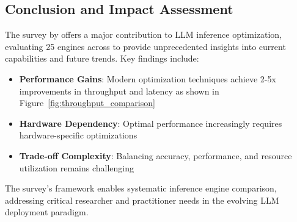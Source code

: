 \documentclass[12pt,a4paper]{article}
\begin{document}
\subsection{Conclusion and Impact Assessment}

The survey by \cite{park2025} offers a major contribution to LLM inference optimization, evaluating 25 engines across to provide unprecedented insights into current capabilities and future trends. Key findings include:

\begin{itemize}
    \item \textbf{Performance Gains}: Modern optimization techniques achieve 2-5x improvements in throughput and latency as shown in Figure~\ref{fig:throughput_comparison}
    
    \item \textbf{Hardware Dependency}: Optimal performance increasingly requires hardware-specific optimizations
    \item \textbf{Trade-off Complexity}: Balancing accuracy, performance, and resource utilization remains challenging
\end{itemize}

The survey's framework enables systematic inference engine comparison, addressing critical researcher and practitioner needs in the evolving LLM deployment paradigm.
\end{document}
